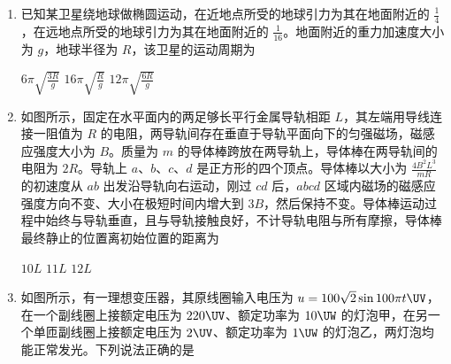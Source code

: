\begin{enumerate}
{$ \frac{{mg}}{{2R}} $}
{$ \frac{{\sqrt 3 mg}}{{3R}} $}
{$ \frac{{mg}}{R} $}


\item
已知某卫星绕地球做椭圆运动，在近地点所受的地球引力为其在地面附近的 $ \frac{1}{4} $，在远地点所受的地球引力为其在地面附近的 $ \frac{1}{16} $。地面附近的重力加速度大小为 $ g $，地球半径为 $ R $，该卫星的运动周期为 


{$ 6 \pi\sqrt {\frac{{3R}}{g}} $}
{$ 16 \pi\sqrt {\frac{{R}}{g}} $}
{$ 12 \pi\sqrt {\frac{{6R}}{g}} $}


\item
如图所示，固定在水平面内的两足够长平行金属导轨相距 $ L $，其左端用导线连接一阻值为 $ R $ 的电阻，两导轨间存在垂直于导轨平面向下的匀强磁场，磁感应强度大小为 $ B $。质量为 $ m $ 的导体棒跨放在两导轨上，导体棒在两导轨间的电阻为 $ 2 R $。导轨上 $ a $、$ b $、$ c $、$ d $ 是正方形的四个顶点。导体棒以大小为 $ \frac{{4{B^2}{L^3}}}{{mR}} $ 的初速度从 $ ab $ 出发沿导轨向右运动，刚过 $ cd $ 后，$ abcd $ 区域内磁场的磁感应强度方向不变、大小在极短时间内增大到 $ 3 B $，然后保持不变。导体棒运动过程中始终与导轨垂直，且与导轨接触良好，不计导轨电阻与所有摩擦，导体棒最终静止的位置离初始位置的距离为 
\begin{figure}[htbp]
	\centering
	
\end{figure}

{$ 10 L $}
{$ 11 L $}
{$ 12 L $}


\item
如图所示，有一理想变压器，其原线圈输入电压为 $ u =100 \sqrt 2 \sin 100 \pi t \UV $，在一个副线圈上接额定电压为 $ 220 \UV $、额定功率为 $ 10 \UW $ 的灯泡甲，在另一个单匝副线圈上接额定电压为 $ 2 \UV $、额定功率为 $ 1 \UW $ 的灯泡乙，两灯泡均能正常发光。下列说法正确的是 
\begin{figure}[htbp]
	\centering
	
\end{figure}


\end{enumerate}
